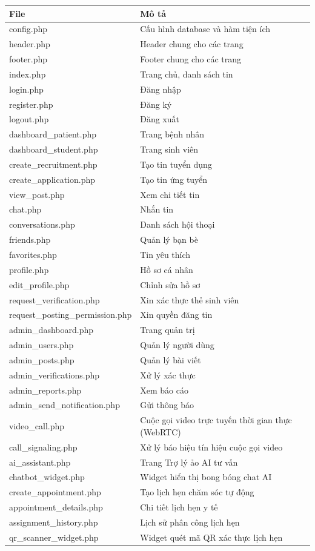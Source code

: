 \documentclass[a4paper,13pt]{extreport}
\begin{document}
\begin{table}[H]
\centering
\begin{tabular}{|l|l|}
\hline
\textbf{File} & \textbf{Mô tả} \\
\hline
config.php & Cấu hình database và hàm tiện ích \\
header.php & Header chung cho các trang \\
footer.php & Footer chung cho các trang \\
index.php & Trang chủ, danh sách tin \\
login.php & Đăng nhập \\
register.php & Đăng ký \\
logout.php & Đăng xuất \\
dashboard\_patient.php & Trang bệnh nhân \\
dashboard\_student.php & Trang sinh viên \\
create\_recruitment.php & Tạo tin tuyển dụng \\
create\_application.php & Tạo tin ứng tuyển \\
view\_post.php & Xem chi tiết tin \\
chat.php & Nhắn tin \\
conversations.php & Danh sách hội thoại \\
friends.php & Quản lý bạn bè \\
favorites.php & Tin yêu thích \\
profile.php & Hồ sơ cá nhân \\
edit\_profile.php & Chỉnh sửa hồ sơ \\
request\_verification.php & Xin xác thực thẻ sinh viên \\
request\_posting\_permission.php & Xin quyền đăng tin \\
admin\_dashboard.php & Trang quản trị \\
admin\_users.php & Quản lý người dùng \\
admin\_posts.php & Quản lý bài viết \\
admin\_verifications.php & Xử lý xác thực \\
admin\_reports.php & Xem báo cáo \\
admin\_send\_notification.php & Gửi thông báo \\
video\_call.php & Cuộc gọi video trực tuyến thời gian thực (WebRTC) \\
call\_signaling.php & Xử lý báo hiệu tín hiệu cuộc gọi video \\
ai\_assistant.php & Trang Trợ lý ảo AI tư vấn \\
chatbot\_widget.php & Widget hiển thị bong bóng chat AI \\
create\_appointment.php & Tạo lịch hẹn chăm sóc tự động \\
appointment\_details.php & Chi tiết lịch hẹn y tế \\
assignment\_history.php & Lịch sử phân công lịch hẹn \\
qr\_scanner\_widget.php & Widget quét mã QR xác thực lịch hẹn \\
\hline
\end{tabular}
\end{table}
\end{document}
